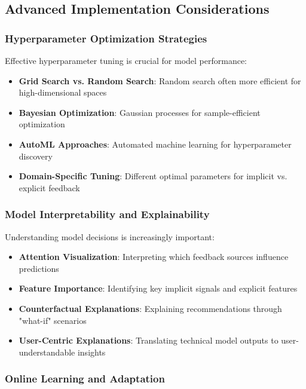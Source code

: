 \subsection{Advanced Implementation Considerations}

\subsubsection{Hyperparameter Optimization Strategies}

Effective hyperparameter tuning is crucial for model performance:

\begin{itemize}
    \item \textbf{Grid Search vs. Random Search}: Random search often more efficient for high-dimensional spaces
    \item \textbf{Bayesian Optimization}: Gaussian processes for sample-efficient optimization
    \item \textbf{AutoML Approaches}: Automated machine learning for hyperparameter discovery
    \item \textbf{Domain-Specific Tuning}: Different optimal parameters for implicit vs. explicit feedback
\end{itemize}

\subsubsection{Model Interpretability and Explainability}

Understanding model decisions is increasingly important:

\begin{itemize}
    \item \textbf{Attention Visualization}: Interpreting which feedback sources influence predictions
    \item \textbf{Feature Importance}: Identifying key implicit signals and explicit features
    \item \textbf{Counterfactual Explanations}: Explaining recommendations through "what-if" scenarios
    \item \textbf{User-Centric Explanations}: Translating technical model outputs to user-understandable insights
\end{itemize}

\subsubsection{Online Learning and Adaptation}

